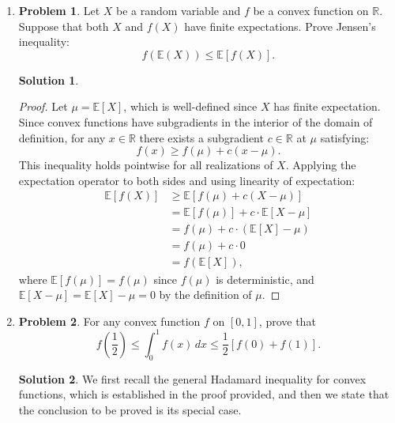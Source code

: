 \documentclass[12pt]{article}
\theoremstyle{definition}
\newtheorem*{solution}{\normalfont\textbf{Solution}}
\newtheorem*{Problem}{\noindent\textbf{Problem}}
\begin{document}
\begin{enumerate}[leftmargin=*]
    
    \item \begin{Problem}
            Let \( X \) be a random variable and \( f \) be a convex function on \( \mathbb{R} \). Suppose that both \( X \) and \( f(X) \) have finite expectations. Prove Jensen's inequality:
            \[
            f(\mathbb{E}(X)) \leq \mathbb{E}[f(X)].
            \]
        \end{Problem}
        \begin{solution}
            \begin{proof}
                Let \(\mu = \mathbb{E}[X]\), which is well-defined since \(X\) has finite expectation. Since convex functions have subgradients in the interior of the domain of definition, for any \(x \in \mathbb{R}\) there exists a subgradient \(c \in \mathbb{R}\) at \(\mu\) satisfying:
                \[
                f(x) \geq f(\mu) + c(x - \mu).
                \]
                This inequality holds pointwise for all realizations of \(X\). Applying the expectation operator to both sides and using linearity of expectation:
                \begin{align*}
                \mathbb{E}[f(X)] 
                &\geq \mathbb{E}\left[f(\mu) + c(X - \mu)\right] \\
                &= \mathbb{E}[f(\mu)] + c \cdot \mathbb{E}[X - \mu] \\
                &= f(\mu) + c \cdot (\mathbb{E}[X] - \mu) \\
                &= f(\mu) + c \cdot 0 \\
                &= f(\mathbb{E}[X]),
                \end{align*}
                where
                \(\mathbb{E}[f(\mu)] = f(\mu)\) since \(f(\mu)\) is deterministic,
                and \(\mathbb{E}[X - \mu] = \mathbb{E}[X] - \mu = 0\) by the definition of \(\mu\).
            \end{proof}
        \end{solution}
            

    \item \begin{Problem}
            For any convex function \( f \) on \( [0, 1] \), prove that
            \[
            f \left( \frac{1}{2} \right) \leq \int_0^1 f(x) \, dx \leq \frac{1}{2} \left[ f(0) + f(1) \right].
            \]
        \end{Problem}
        \begin{solution}
            We first recall the general Hadamard inequality for convex functions, which is established in the proof provided, and then we state that the conclusion to be proved is its special case.
    

\end{solution}
\end{enumerate}
\end{document}
